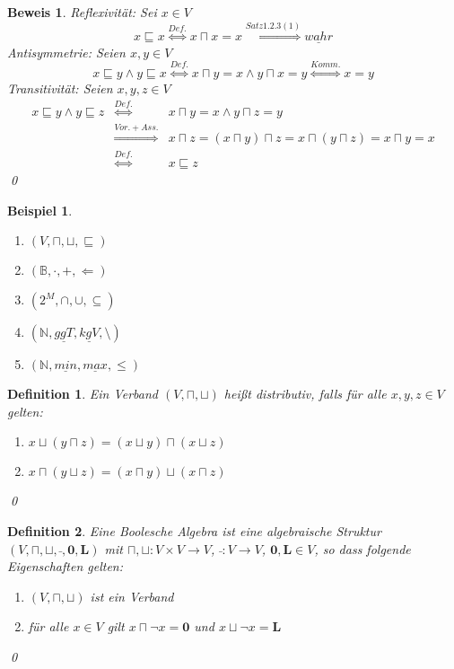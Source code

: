 \documentclass[ngerman]{scrartcl}
\theoremstyle{custom}
\newtheorem{mdef}{Definition} \numberwithin{mdef}{subsection}
\newtheorem*{ex}{Beispiel}
\newtheorem*{bw}{Beweis}
\newcommand{\0}{\mathbf{0}}
\newcommand{\1}{\mathbf{L}}
\begin{document}
\begin{bw}
Reflexivit\"at: Sei $x \in V$
\begin{equation*}
x \sqsubseteq x \stackrel{Def.}{\Leftrightarrow} x \sqcap x = x
\stackrel{Satz 1.2.3 (1)}{\Leftrightarrow}
\underline{wahr}
\end{equation*}
Antisymmetrie: Seien $x, y \in V$
\begin{equation*}
x \sqsubseteq y \wedge y \sqsubseteq x \stackrel{Def.}{\Leftrightarrow} x \sqcap y = x
\wedge y \sqcap x = y \stackrel{Komm.}{\Leftrightarrow} x= y
\end{equation*}
Transitivit\"at: Seien $x,y, z \in V$
\begin{eqnarray*}
x \sqsubseteq y \wedge y \sqsubseteq z
&\stackrel{Def.}{\Leftrightarrow}& x \sqcap y = x \wedge y \sqcap z =
y \\
&\stackrel{Vor. + Ass.}{\Rightarrow}& x \sqcap z = (x \sqcap y) \sqcap z
= x \sqcap (y \sqcap z) = x \sqcap y = x \\
&\stackrel{Def.}{\Leftrightarrow}& x \sqsubseteq z
\end{eqnarray*}
\qed
\end{bw}

\begin{ex}
\begin{enumerate}
\item $(V, \sqcap, \sqcup, \sqsubseteq)$
\item $(\mathds{B}, \cdot, +, \Leftarrow)$
\item $(2^M, \cap, \cup, \subseteq)$
\item $(\mathds{N}, \underline{ggT}, \underline{kgV}, \setminus)$
\item $(\mathds{N}, \underline{min}, \underline{max}, \le)$
\end{enumerate}
\end{ex}

\begin{mdef} Ein Verband $(V, \sqcap, \sqcup)$ hei\ss t distributiv,
  falls f\"ur alle $x, y, z \in V$ gelten:
\begin{enumerate}
\item $x \sqcup (y \sqcap z) = (x \sqcup y) \sqcap (x \sqcup z)$
\item $x \sqcap (y \sqcup z) = (x \sqcap y) \sqcup (x \sqcap z)$
\end{enumerate}
\qed
\end{mdef}

\begin{mdef}
Eine Boolesche Algebra ist eine algebraische Struktur $(V, \sqcap,
\sqcup, \bar~, \mathbf{0}, \mathbf{L})$ mit $\sqcap, \sqcup: V \times V
\rightarrow V$, $\bar~: V \rightarrow V$, $\mathbf{0}, \mathbf{L} \in
V$, so dass folgende Eigenschaften gelten:
\begin{enumerate}
\item $(V, \sqcap, \sqcup)$ ist ein Verband
\item f\"ur alle $x \in V$ gilt $x \sqcap \neg x = \mathbf{0}$ und
  $x \sqcup \neg x = \mathbf{L}$
\end{enumerate}
\qed
\end{mdef}
\end{document}
